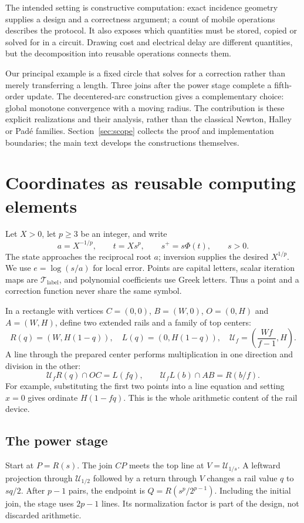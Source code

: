 \documentclass[11pt,a4paper]{article}
\newcommand{\map}[1]{\mathcal T_{\mathrm{#1}}}
\newcommand{\hub}[1]{\mathcal U_{#1}}
\begin{document}
The intended setting is constructive computation: exact incidence geometry supplies a design and a correctness argument; a count of mobile operations describes the protocol. It also exposes which quantities must be stored, copied or solved for in a circuit. Drawing cost and electrical delay are different quantities, but the decomposition into reusable operations connects them.

Our principal example is a fixed circle that solves for a correction rather than merely transferring a length. Three joins after the power stage complete a fifth-order update. The decentered-arc construction gives a complementary choice: global monotone convergence with a moving radius. The contribution is these explicit realizations and their analysis, rather than the classical Newton, Halley or Pad\'e families. Section~\ref{sec:scope} collects the proof and implementation boundaries; the main text develops the constructions themselves.
\clearpage

\section{Coordinates as reusable computing elements}\label{sec:rails}
Let $X>0$, let $p\ge3$ be an integer, and write
\[
 a=X^{-1/p},\qquad t=Xs^p,\qquad s^+=s\Phi(t),\qquad s>0.
\]
The state approaches the reciprocal root $a$; inversion supplies the desired $X^{1/p}$. We use $e=\log(s/a)$ for local error. Points are capital letters, scalar iteration maps are $\map{label}$, and polynomial coefficients use Greek letters. Thus a point and a correction function never share the same symbol.

In a rectangle with vertices $C=(0,0)$, $B=(W,0)$, $O=(0,H)$ and $A=(W,H)$, define two extended rails and a family of top centers:
\begin{equation}\label{eq:rails}
 R(q)=(W,H(1-q)),\quad L(q)=(0,H(1-q)),\quad
 \hub{f}=\left(\frac{Wf}{f-1},H\right).
\end{equation}
A line through the prepared center performs multiplication in one direction and division in the other:
\begin{equation}\label{eq:railops}
 \hub{f}R(q)\cap OC=L(fq),\qquad
 \hub{f}L(b)\cap AB=R(b/f).
\end{equation}
For example, substituting the first two points into a line equation and setting $x=0$ gives ordinate $H(1-fq)$. This is the whole arithmetic content of the rail device.

\subsection{The power stage}
Start at $P=R(s)$. The join $CP$ meets the top line at $V=\hub{1/s}$. A leftward projection through $\hub{1/2}$ followed by a return through $V$ changes a rail value $q$ to $sq/2$. After $p-1$ pairs, the endpoint is $Q=R(s^p/2^{p-1})$. Including the initial join, the stage uses $2p-1$ lines. Its normalization factor is part of the design, not discarded arithmetic.
\end{document}
